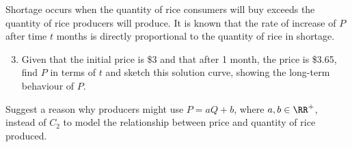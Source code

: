 \begin{problem}
    Shortage occurs when the quantity of rice consumers will buy exceeds the quantity of rice producers will produce. It is known that the rate of increase of $P$ after time $t$ months is directly proportional to the quantity of rice in shortage.

    \begin{enumerate}
        \setcounter{enumi}{2}
        \item Given that the initial price is \$3 and that after 1 month, the price is \$3.65, find $P$ in terms of $t$ and sketch this solution curve, showing the long-term behaviour of $P$.
    \end{enumerate}

    Suggest a reason why producers might use $P = aQ + b$, where $a, b \in \RR^+$, instead of $C_2$ to model the relationship between price and quantity of rice produced.
\end{problem}
